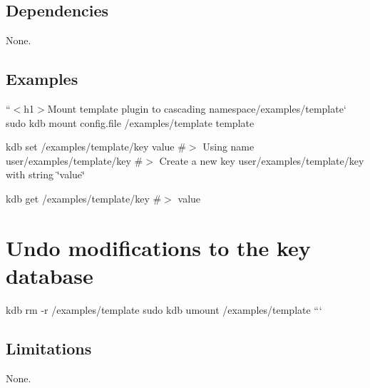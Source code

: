 \subsection*{Dependencies}

None.

\subsection*{Examples}

``{\ttfamily  $<$h1$>$Mount template plugin to cascading namespace}/examples/template` sudo kdb mount config.\+file /examples/template template

kdb set /examples/template/key value \#$>$ Using name user/examples/template/key \#$>$ Create a new key user/examples/template/key with string \char`\"{}value\char`\"{}

kdb get /examples/template/key \#$>$ value

\section*{Undo modifications to the key database}

kdb rm -\/r /examples/template sudo kdb umount /examples/template ```

\subsection*{Limitations}

None. 